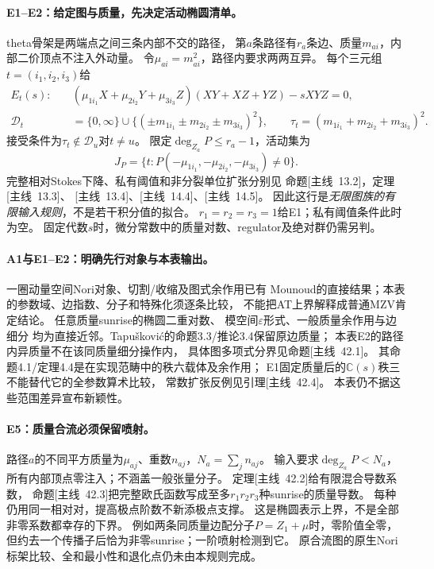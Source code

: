\documentclass[11pt,a4paper]{ctexart}
\theoremstyle{cnplain}\newtheorem{theorem}{定理}[section]
\theoremstyle{definition}\newtheorem{definition}[theorem]{定义}
\theoremstyle{remark}\newtheorem{remark}[theorem]{注}
\begin{document}
\paragraph{E1--E2：给定图与质量，先决定活动椭圆清单。}
theta骨架是两端点之间三条内部不交的路径，
第$a$条路径有$r_a$条边、质量$m_{ai}$，内部二价顶点不注入外动量。
令$\mu_{ai}=m_{ai}^2$，路径内要求两两互异。
每个三元组$t=(i_1,i_2,i_3)$给
\begin{align*}
 E_t(s):\quad &(\mu_{1i_1}X+\mu_{2i_2}Y+\mu_{3i_3}Z)
                         (XY+XZ+YZ)-sXYZ=0,\\
 \mathcal D_t&=\{0,\infty\}\cup
   \{(\pm m_{1i_1}\pm m_{2i_2}\pm m_{3i_3})^2\},\qquad
 \tau_t=(m_{1i_1}+m_{2i_2}+m_{3i_3})^2.
\end{align*}
接受条件为$\tau_t\notin\mathcal D_u$对$t\ne u$。
限定$\deg_{Z_a}P\le r_a-1$，活动集为
\[
 J_P=\{t:P(-\mu_{1i_1},-\mu_{2i_2},-\mu_{3i_3})\ne0\}.
\]
完整相对Stokes下降、私有阈值和非分裂单位扩张分别见
命题\textup{[主线~13.2]}，定理\textup{[主线~13.3]}、
\textup{[主线~13.4]}、\textup{[主线~14.4]}、\textup{[主线~14.5]}。
因此这行是\emph{无限图族的有限输入规则}，不是若干积分值的拟合。
$r_1=r_2=r_3=1$给E1；私有阈值条件此时为空。
固定代数$s$时，微分常数中的质量对数、regulator及绝对群仍需另判。


\paragraph{A1与E1--E2：明确先行对象与本表输出。}
一圈动量空间Nori对象、切割/收缩及图式余作用已有
Mounoud的直接结果\cite{LitMou}；本表的参数域、边指数、分子和特殊化须逐条比较，
不能把AT上界解释成普通MZV肯定结论。
任意质量sunrise的椭圆二重对数\cite{LitABW}、
模空间$\varepsilon$形式\cite{LitBMW}、一般质量余作用与边细分\cite{LitTap}
均为直接近邻。Tapušković的命题3.3/推论3.4保留原边质量；
本表E2的路径内异质量不在该同质量细分操作内，
具体图多项式分界见命题\textup{[主线~42.1]}。
其命题4.1/定理4.4是在实现范畴中的秩六载体及余作用；
E1固定质量后的$\mathbb C(s)$秩三不能替代它的全参数算术比较，
常数扩张反例见引理\textup{[主线~42.4]}。
本表仍不据这些范围差异宣布新颖性。

\paragraph{E5：质量合流必须保留喷射。}
路径$a$的不同平方质量为$\mu_{aj}$、重数$n_{aj}$，$N_a=\sum_j n_{aj}$。
输入要求$\deg_{Z_a}P<N_a$，所有内部顶点零注入；不涵盖一般张量分子。
定理\textup{[主线~42.2]}给有限混合导数系数，
命题\textup{[主线~42.3]}把完整欧氏函数写成至多$r_1r_2r_3$种sunrise的质量导数。
每种仍用同一相对对，提高极点阶数不新添极点支撑。
这是椭圆表示上界，不是全部非零系数都幸存的下界。
例如两条同质量边配分子$P=Z_1+\mu$时，零阶值全零，
但约去一个传播子后恰为非零sunrise；一阶喷射检测到它。
原合流图的原生Nori标架比较、全和最小性和退化点仍未由本规则完成。
\end{document}
